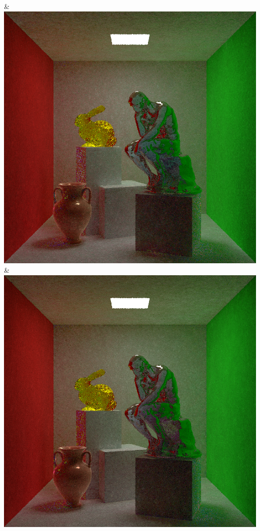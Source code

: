& \includegraphics[width=\linewidth]{figures/py/tests/quality_comparison/nrc+sppc+Rej70_1spp_thinker.png}
& \includegraphics[width=\linewidth]{figures/py/tests/quality_comparison/nrc+sppc+Rej70+RejN_1spp_thinker.png}
